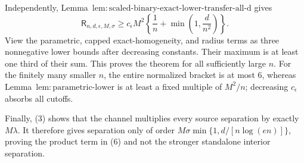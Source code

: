 Independently, Lemma~\(\mathrm{lem:scaled\text{-}binary\text{-}exact\text{-}lower\text{-}transfer\text{-}all\text{-}d}\) gives
\[
 \mathsf R_{n,d,\epsilon,M,\sigma}
 \ge c_{\epsilon}M^2\left\{\frac1n+\min\left(1,\frac d{n^2}\right)\right\}.
\tag{7}
\]
View the parametric, capped exact-homogeneity, and radius terms as three nonnegative lower bounds after decreasing constants.  Their maximum is at least one third of their sum.  This proves the theorem for all sufficiently large \(n\).  For the finitely many smaller \(n\), the entire normalized bracket is at most \(6\), whereas Lemma~\(\mathrm{lem:parametric\text{-}lower}\) is at least a fixed multiple of \(M^2/n\); decreasing \(c_{\epsilon}\) absorbs all cutoffs.

Finally, (3) shows that the channel multiplies every source separation by exactly \(M\lambda\).  It therefore gives separation only of order \(M\sigma\min\{1,d/[n\log(en)]\}\), proving the product term in (6) and not the stronger standalone interior separation.